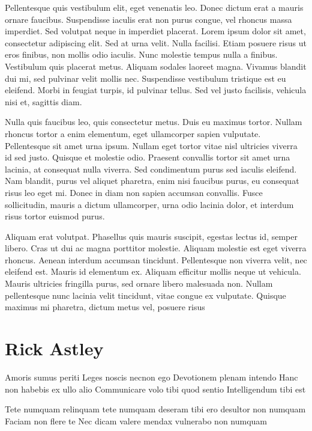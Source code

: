Pellentesque quis vestibulum elit, eget venenatis leo. 
Donec dictum erat a mauris ornare faucibus. 
Suspendisse iaculis erat non purus congue, vel rhoncus massa imperdiet. 
Sed volutpat neque in imperdiet placerat. Lorem ipsum dolor sit amet, consectetur adipiscing elit. 
Sed at urna velit. 
Nulla facilisi. 
Etiam posuere risus ut eros finibus, non mollis odio iaculis. 
Nunc molestie tempus nulla a finibus. Vestibulum quis placerat metus. 
Aliquam sodales laoreet magna. 
Vivamus blandit dui mi, sed pulvinar velit mollis nec. 
Suspendisse vestibulum tristique est eu eleifend. 
Morbi in feugiat turpis, id pulvinar tellus. 
Sed vel justo facilisis, vehicula nisi et, sagittis diam.

Nulla quis faucibus leo, quis consectetur metus. 
Duis eu maximus tortor. 
Nullam rhoncus tortor a enim elementum, eget ullamcorper sapien vulputate. 
Pellentesque sit amet urna ipsum. 
Nullam eget tortor vitae nisl ultricies viverra id sed justo. 
Quisque et molestie odio. 
Praesent convallis tortor sit amet urna lacinia, at consequat nulla viverra. 
Sed condimentum purus sed iaculis eleifend. 
Nam blandit, purus vel aliquet pharetra, enim nisi faucibus purus, eu consequat risus leo eget mi. 
Donec in diam non sapien accumsan convallis. 
Fusce sollicitudin, mauris a dictum ullamcorper, urna odio lacinia dolor, et interdum risus tortor euismod purus.

Aliquam erat volutpat.
Phasellus quis mauris suscipit, egestas lectus id, semper libero.
Cras ut dui ac magna porttitor molestie.
Aliquam molestie est eget viverra rhoncus.
Aenean interdum accumsan tincidunt.
Pellentesque non viverra velit, nec eleifend est.
Mauris id elementum ex.
Aliquam efficitur mollis neque ut vehicula.
Mauris ultricies fringilla purus, sed ornare libero malesuada non.
Nullam pellentesque nunc lacinia velit tincidunt, vitae congue ex vulputate.
Quisque maximus mi pharetra, dictum metus vel, posuere risus

\section{Rick Astley}

Amoris sumus periti
Leges noscis necnon ego
Devotionem plenam intendo
Hanc non habebis ex ullo alio
Communicare volo tibi quod sentio
Intelligendum tibi est
 
Tete numquam relinquam
tete numquam deseram
tibi ero desultor non numquam
Faciam non flere te
Nec dicam valere
mendax vulnerabo non numquam
 
